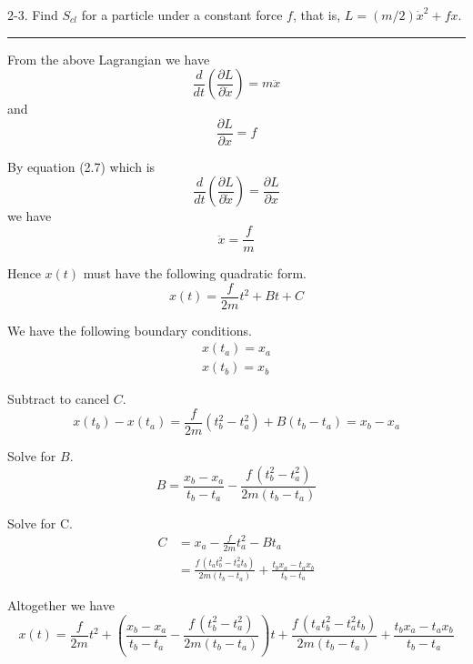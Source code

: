 \documentclass[12pt]{article}
\begin{document}
2-3.
Find $S_{cl}$ for a particle under a constant force $f$, that is,
$L=(m/2)\dot x^2+fx$.

\bigskip
\hrule

\bigskip
From the above Lagrangian we have
\begin{equation*}
\frac{d}{dt}\left(\frac{\partial L}{\partial\dot x}\right)=m\ddot x
\end{equation*}
and
\begin{equation*}
\frac{\partial L}{\partial x}=f
\end{equation*}

By equation (2.7) which is
\begin{equation*}
\frac{d}{dt}\left(\frac{\partial L}{\partial\dot x}\right)=\frac{\partial L}{\partial x}
\end{equation*}
we have
\begin{equation*}
\ddot x=\frac{f}{m}
\end{equation*}

Hence $x(t)$ must have the following quadratic form.
\begin{equation*}
x(t)=\frac{f}{2m}t^2+Bt+C
\end{equation*}

We have the following boundary conditions.
\begin{align*}
x(t_a)=x_a\\
x(t_b)=x_b
\end{align*}

Subtract to cancel $C$.
\begin{equation*}
x(t_b)-x(t_a)=\frac{f}{2m}\left(t_b^2-t_a^2\right)+B(t_b-t_a)=x_b-x_a
\end{equation*}

Solve for $B$.
\begin{equation*}
B=\frac{x_b-x_a}{t_b-t_a}-\frac{f\,\left(t_b^2-t_a^2\right)}{2m(t_b-t_a)}
\end{equation*}

Solve for C.
\begin{align*}
C&=x_a-\frac{f}{2m}t_a^2-Bt_a
\\[1ex]
&=\frac{f\,\left(t_a t_b^2 - t_a^2 t_b\right)}{2 m (t_b - t_a)} + \frac{t_b x_a - t_a x_b}{t_b - t_a}
\end{align*}

Altogether we have
\begin{equation*}
x(t)=
\frac{f}{2m}t^2
+\left(\frac{x_b-x_a}{t_b-t_a}-\frac{f\,\left(t_b^2-t_a^2\right)}{2m(t_b-t_a)}\right)t
+\frac{f\,\left(t_a t_b^2 - t_a^2 t_b\right)}{2 m (t_b - t_a)} + \frac{t_b x_a - t_a x_b}{t_b - t_a}
\tag{1}
\end{equation*}
\end{document}
